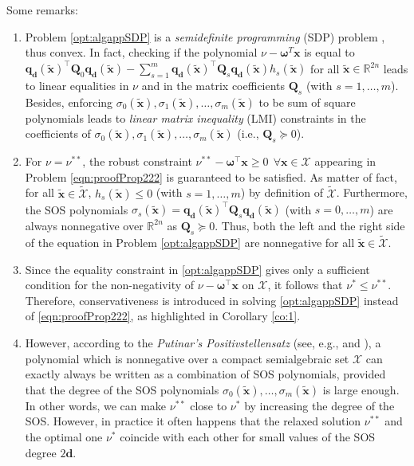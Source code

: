 \documentclass[twocolumn]{autart}
\newcommand{\DP}[1]{{#1}}
\newcommand{\xaug}{\tilde{\mathbf{x}}}
\newcommand{\relorder}{\DP{\mathbf{d}}}
\begin{document}
Some remarks:
\begin{enumerate}
 \item Problem \eqref{opt:algappSDP} is a \emph{semidefinite programming} (SDP) problem \cite{2003Apa,2003AChGaTe}, thus convex. In fact, checking if  the polynomial $\nu-\boldsymbol{\omega}^T\mathbf{x}$ is equal to $\mathbf{q}_\relorder(\xaug)^\top \mathbf{Q}_0 \mathbf{q}_\relorder(\xaug)-\sum_{s=1}^m \mathbf{q}_\relorder(\xaug)^\top \mathbf{Q}_s \mathbf{q}_\relorder(\xaug) h_s(\xaug)$ for all $\xaug \in \mathbb{R}^{2n}$ leads to linear equalities in  $\nu$ and in the matrix coefficients $\mathbf{Q}_s$ (with $s=1,\ldots,m$).  Besides, enforcing  $\sigma_0(\xaug), \sigma_1(\xaug), \ldots, \sigma_m(\xaug)$ to be sum of square polynomials leads to \emph{linear matrix inequality} (LMI) constraints in the coefficients of $\sigma_0(\xaug), \sigma_1(\xaug), \ldots, \sigma_m(\xaug)$ (i.e., $\mathbf{Q}_s \succeq 0$).  %
     \item For $\nu=\nu^{**}$,   the robust constraint $  \nu^{**} - \boldsymbol{\omega}^{\top}   \mathbf{x} \geq 0 \ \ \forall  \mathbf{x} \in \mathcal{X}$ appearing in Problem \eqref{eqn:proofProp222} is guaranteed to be satisfied. As matter of fact, for all $\xaug \in \tilde{\mathcal{X}}$, $h_s(\xaug) \leq 0$ (with $s=1,\ldots,m$) by definition of $\tilde{\mathcal{X}}$. Furthermore,  the SOS polynomials  $\sigma_s(\xaug)=\mathbf{q}_\relorder(\xaug)^\top \mathbf{Q}_s \mathbf{q}_\relorder(\xaug)$ (with $s=0,\ldots,m$) are always nonnegative over $\mathbb{R}^{2n}$ as $\mathbf{Q}_s\succeq 0$. Thus, both the left and the right side of the equation in Problem \eqref{opt:algappSDP} are nonnegative  for all $\xaug \in \tilde{\mathcal{X}}$.
  \item Since the equality constraint in \eqref{opt:algappSDP} gives only a sufficient condition for the non-negativity of $\nu - \boldsymbol{\omega}^\top   \mathbf{x}$
  on $\mathcal{X}$, it follows that   $\nu^{*}\leq \nu^{**}$. Therefore,   conservativeness is introduced in solving \eqref{opt:algappSDP} instead of \eqref{eqn:proofProp222}, as highlighted in Corollary \ref{co:1}.
  \item However, according to the \emph{Putinar's Positivstellensatz} \DP{(see, e.g., \cite{Putinar93} and \cite[Ch. 3]{2009Ala}),} a  polynomial  which is nonnegative over a compact semialgebraic set $\mathcal{X}$ can exactly always be written as a combination of SOS polynomials, provided that the degree of the SOS polynomials  $\sigma_0(\xaug),\ldots,\sigma_m(\xaug)$ is large enough.
  In other words, we can make $\nu^{**}$ close to $\nu^{*}$ by increasing the degree of the SOS.
However, in practice it often happens that the relaxed solution $\nu^{**}$ and the optimal one $\nu^{*}$  coincide with each other for small values of the SOS degree $2\relorder$. %
\end{enumerate}
\end{document}
